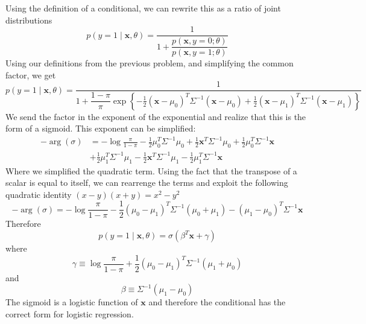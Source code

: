 \documentclass{article}
\numberwithin{equation}{section}
\begin{document}
Using the definition of a conditional, we can rewrite this as a ratio of joint distributions
$$
p(y = 1 \mid \mathbf{x}, \theta) = \frac{1}{1 + \dfrac{ p(\mathbf{x}, y =0; \theta) }{p(\mathbf{x}, y = 1; \theta) }}
$$
Using our definitions from the previous problem, and simplifying the common factor, we get
$$
p(y = 1 \mid \mathbf{x}, \theta) = \frac{1}{1 + \dfrac{1 - \pi}{\pi}\exp \left\{ -  \frac{1}{2}(\mathbf{x} - \mu_0)^T\Sigma^{-1}(\mathbf{x} - \mu_0 ) +   \frac{1}{2}(\mathbf{x} - \mu_1)^T\Sigma^{-1}(\mathbf{x} - \mu_1 )\right\}}
$$
We send the factor in the exponent of the exponential and realize that this is the form of a sigmoid. This exponent can be simplified:
\begin{align}
-\arg(\sigma) &= -\log \frac{\pi}{1 - \pi}  - \frac{1}{2} \mu_0^T \Sigma^{-1}\mu_0 + \frac{1}{2}\mathbf{x}^T \Sigma^{-1} \mu_0   + \frac{1}{2} \mu_0^T \Sigma^{-1} \mathbf{x}\\
&  +\frac{1}{2}\mu_1^T\Sigma^{-1}\mu_1 - \frac{1}{2}\mathbf{x}^T\Sigma^{-1}\mu_1 - \frac{1}{2}\mu_1^T \Sigma^{-1} \mathbf{x}
\end{align}
Where we simplified the quadratic term. Using the fact that the transpose of a scalar is equal to itself, we can rearrenge the terms and exploit the following quadratic identity $(x - y)(x + y) = x^2 - y^2$
$$
-\arg(\sigma) = -\log \frac{\pi}{1 - \pi}  - \frac{1}{2} (\mu_0 - \mu_1)^T\Sigma^{-1}(\mu_0 + \mu_1) -(\mu_1 - \mu_0)^T \Sigma^{-1} \mathbf{x}
$$
Therefore
$$
p(y = 1 \mid \mathbf{x}, \theta) = \sigma(\beta^T \mathbf{x} + \gamma)
$$
where
$$
\gamma \equiv \log \dfrac{\pi}{1 - \pi} +   \frac{1}{2}(\mu_0 - \mu_1)^T\Sigma^{-1}(\mu_1 + \mu_0 )
$$
and
$$
\beta \equiv \Sigma^{-1} (\mu_1 - \mu_0)
$$
The sigmoid is a logistic function of $\mathbf{x}$ and therefore the conditional has the correct form for logistic regression.
\end{document}
